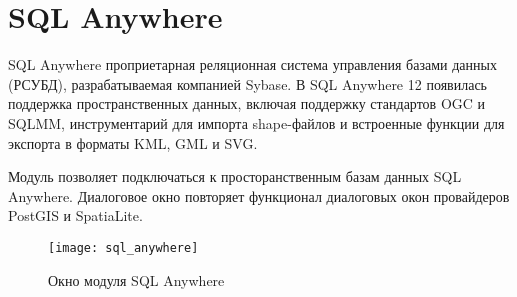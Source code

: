 
\section{SQL Anywhere}\label{sec:sqlanywhere}


SQL Anywhere проприетарная реляционная система управления базами данных
(РСУБД), разрабатываемая компанией Sybase. В SQL Anywhere 12 появилась
поддержка пространственных данных, включая поддержку стандартов OGC и
SQLMM, инструментарий для импорта shape-файлов и встроенные функции для
экспорта в форматы KML, GML и SVG.

Модуль  позволяет подключаться к
просторанственным базам данных SQL Anywhere. Диалоговое окно 
повторяет функционал диалоговых окон провайдеров PostGIS и SpatiaLite.

\begin{figure}[ht]
   \centering
   \texttt{[image: sql\_anywhere]}
   \caption{Окно модуля SQL Anywhere \nixcaption}
   \label{fig:sqlanywhere}
\end{figure}


\FloatBarrier
